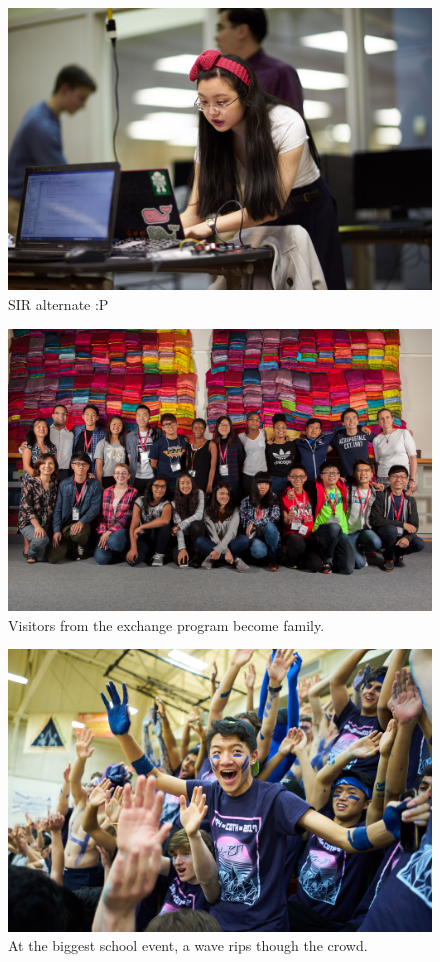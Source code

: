 \documentclass{report}
\begin{document}
\begin{figure}
  \includegraphics[width=\linewidth]{res/port_sir_alternate.jpg}
  \caption{SIR alternate :P}
\end{figure}

\begin{figure}
  \includegraphics[width=\linewidth]{res/group_taiwan.jpg}
  \caption{Visitors from the exchange program become family.}
\end{figure}

\begin{figure}
  \includegraphics[width=\linewidth]{res/event_simon.jpg}
  \caption{At the biggest school event, a wave rips though the crowd.}
\end{figure}
\end{document}
